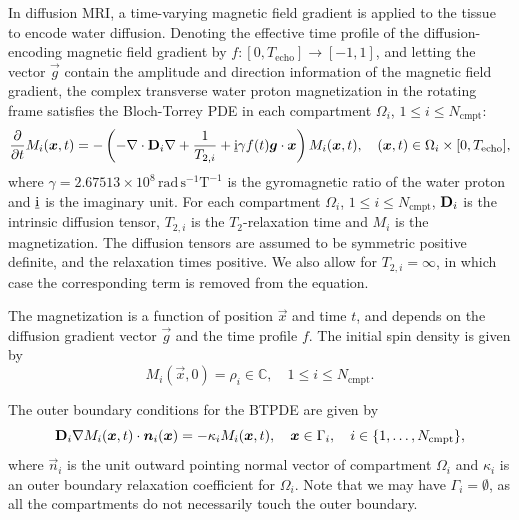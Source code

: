 \documentclass[a4paper]{article}
\begin{document}
In diffusion MRI, a time-varying magnetic field gradient is applied to the tissue to encode water diffusion. Denoting the effective time profile of the diffusion-encoding magnetic field gradient by $f : [0, T_\text{echo}] \to [-1, 1]$, and letting the vector $\vec{g}$ contain the amplitude and direction information of the magnetic field gradient, the complex transverse water proton magnetization in the rotating frame satisfies the Bloch-Torrey PDE in each compartment $\Omega_i$, $1 \leq i \leq N_\text{cmpt}$:
\begin{equation} \label{eq:btpde}
    \frac{\partial}{\partial t} M_i(\bm{x},t) = -\left(-\nabla \cdot \mathbf{D}_i \nabla + \frac{1}{T_{2,i}} + \underline{\mathrm{i}} \gamma f(t) \bm{g} \cdot \bm{x}\right) M_i(\bm{x}, t), \quad (\bm{x}, t) \in \Omega_i \times[0, T_\text{echo}],
\end{equation}
where $\gamma = 2.67513\times 10^8 \, \mathrm{rad \, s^{-1} T^{-1}}$ is the gyromagnetic ratio of the water proton and $\underline{\mathrm{i}}$ is the imaginary unit. For each compartment $\Omega_i$, $1 \leq i \leq N_\text{cmpt}$, $\mathbf{D}_i$ is the intrinsic diffusion tensor, $T_{2,i}$ is the $T_2$-relaxation time and $M_i$ is the magnetization. The diffusion tensors are assumed to be symmetric positive definite, and the relaxation times positive. We also allow for $T_{2,i} = \infty$, in which case the corresponding term is removed from the equation.

The magnetization is a function of position $\vec{x}$ and time $t$, and depends on the diffusion gradient vector $\vec{g}$ and the time profile $f$. The initial spin density is given by
\begin{equation}
    M_i(\vec{x}, 0) = \rho_i \in \mathbb{C}, \quad 1 \leq i \leq N_\text{cmpt}.
\end{equation}

The outer boundary conditions for the BTPDE are given by
\begin{equation}
    \mathbf{D}_i \nabla M_i(\bm{x}, t) \cdot \bm{n}_i(\bm{x}) = -\kappa_i M_i(\bm{x}, t), \quad \bm{x} \in \Gamma_i, \quad i \in \{1, \dots, N_\text{cmpt}\},
\end{equation}
where $\vec{n}_i$ is the unit outward pointing normal vector of compartment $\Omega_i$ and $\kappa_i$ is an outer boundary relaxation coefficient for $\Omega_i$. Note that we may have $\Gamma_i = \emptyset$, as all the compartments do not necessarily touch the outer boundary.
\end{document}
